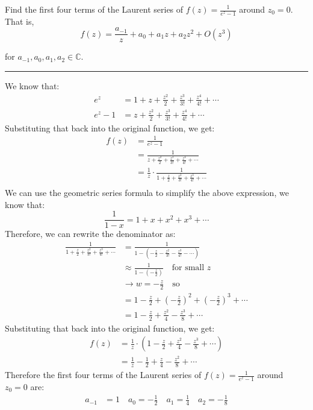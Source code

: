 \begin{example}

    Find the first four terms of the Laurent series of $f(z)=\frac1{e^z-1}$ around $z_0=0.$ That is,
    $$f(z)=\frac{a_{-1}}z+a_0+a_1z+a_2z^2+O(z^3)$$

    for $a_{-1},a_0,a_1,a_2\in\mathbb{C}.$

    \hrule
    \vspace{0.5cm}

    We know that:
    \begin{align*}
        e^z   & =1+z+\frac{z^2}{2}+\frac{z^3}{3!}+ \frac{z^4}{4!}+\cdots \\
        e^z-1 & =z+\frac{z^2}{2}+\frac{z^3}{3!}+ \frac{z^4}{4!}+\cdots
    \end{align*}
    Substituting that back into the original function, we get:
    \begin{align*}
        f(z) & =\frac1{e^z-1}                                                           \\
             & =\frac1{z+\frac{z^2}{2}+\frac{z^3}{3!}+ \frac{z^4}{4!}+\cdots}           \\
             & =\frac1z\cdot\frac1{1+\frac{z}{2}+\frac{z^2}{3!}+ \frac{z^3}{4!}+\cdots} \\
    \end{align*}
    We can use the geometric series formula to simplify the above expression, we know that:
    $$\frac1{1-x}=1+x+x^2+x^3+\cdots$$
    Therefore, we can rewrite the denominator as:
    \begin{align*}
        \frac1{1+\frac{z}{2}+\frac{z^2}{3!}+ \frac{z^3}{4!}+\cdots} & =\frac1{1-\left(-\frac z{2}-\frac{z^2}{3!}- \frac{z^3}{4!}-\cdots\right)} \\
                                                                    & \approx \frac1{1-\left(-\frac z{2}\right)} \quad \text{for small } z      \\
                                                                    & \rightarrow w = -\frac{z}{2} \quad \text{so}                              \\
                                                                    & = 1 - \frac{z}{2} + (-\frac{z}{2})^2 + (-\frac{z}{2})^3 + \cdots          \\
                                                                    & = 1 - \frac{z}{2} + \frac{z^2}{4} - \frac{z^3}{8} + \cdots
    \end{align*}
    Substituting that back into the original function, we get:
    \begin{align*}
        f(z) & =\frac1z\cdot\left(1 - \frac{z}{2} + \frac{z^2}{4} - \frac{z^3}{8} + \cdots\right) \\
             & =\frac1z-\frac{1}{2}+\frac{z}{4}-\frac{z^2}{8}+\cdots
    \end{align*}
    Therefore the first four terms of the Laurent series of $f(z)=\frac1{e^z-1}$ around $z_0=0$ are:
    \begin{align*}
        a_{-1} & =1 \quad a_0=-\frac 12 \quad a_1=\frac 14 \quad a_2=-\frac 18
    \end{align*}
\end{example}

